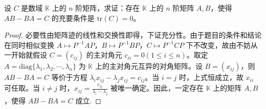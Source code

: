 \documentclass[../../main.tex]{subfiles}
\begin{document}
\begin{proposition}\label{proposition:矩阵迹零的充要条件}
设 $C$ 是数域 $\mathbb{K}$ 上的 $n$ 阶矩阵，求证：存在 $\mathbb{K}$ 上的 $n$ 阶矩阵 $A,B$，使得 $AB - BA = C$ 的充要条件是 $\mathrm{tr}(C)=0$。
\end{proposition}
\begin{proof}
必要性由矩阵迹的线性和交换性即得，下证充分性。由于题目的条件和结论在同时相似变换 $A\mapsto P^{-1}AP$，$B\mapsto P^{-1}BP$，$C\mapsto P^{-1}CP$ 下不改变，故由不妨从一开始就假设 $C=(c_{ij})$ 的主对角元 $c_{ii}=0 (1\leq i\leq n)$。取定 $A = \mathrm{diag}\{\lambda_1,\lambda_2,\cdots,\lambda_n\}$ 为 $\mathbb{K}$ 上的主对角元互异的对角矩阵。设 $B=(x_{ij})$，则 $AB - BA = C$ 等价于方程 $\lambda_ix_{ij}-\lambda_jx_{ij}=c_{ij}$。当 $i = j$ 时，上式恒成立，故 $x_{ii}$ 可任取。当 $i\neq j$ 时，$x_{ij}=\frac{c_{ij}}{\lambda_i - \lambda_j}$ 被唯一确定。因此，一定存在 $\mathbb{K}$ 上的矩阵 $A,B$，使得 $AB - BA = C$ 成立.
\end{proof}
\end{document}
